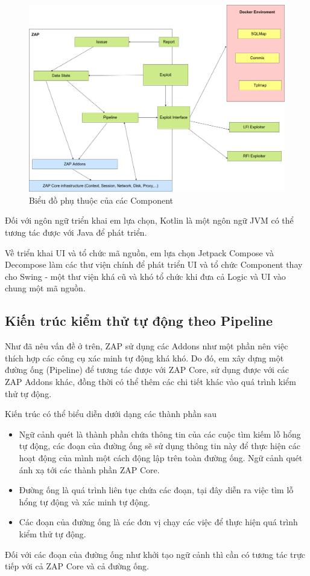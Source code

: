\documentclass[./../main.tex]{subfiles}
\begin{document}
\begin{figure}[h!]
	\includegraphics[width=\linewidth]{./images/component.drawio.png}
	\caption{Biểu đồ phụ thuộc của các Component}
	\label{fig:component}
\end{figure}

Đối với ngôn ngữ triển khai em lựa chọn, Kotlin là một ngôn ngữ JVM có thể tương tác được với Java để phát triển.

Về triển khai UI và tổ chức mã nguồn, em lựa chọn Jetpack Compose và Decompose làm các thư viện chính để phát triển UI và tổ chức Component thay cho Swing - một thư viện khá cũ và khó tổ chức khi đưa cả Logic và UI vào chung một mã nguồn.

\subsection{Kiến trúc kiểm thử tự động theo Pipeline}
Như đã nêu vấn đề ở trên, ZAP sử dụng các Addons như một phần nên việc thích hợp các công cụ xác minh tự động khá khó. Do đó, em xây dựng một đường ống (Pipeline) để tương tác được với ZAP Core, sử dụng được với các ZAP Addons khác, đồng thời có thể thêm các chi tiết khác vào quá trình kiểm thử tự động.

Kiến trúc có thể biểu diễn dưới dạng các thành phần sau
\begin{itemize}
	\item Ngữ cảnh quét là thành phần chứa thông tin của các cuộc tìm kiếm lỗ hổng tự động, các đoạn của đường ống sẽ sử dụng thông tin này để thực hiện các hoạt động của mình một cách động lập trên toàn đường ống. Ngữ cảnh quét ánh xạ tới các thành phần ZAP Core.
	\item Đường ống là quá trình liên tục chứa các đoạn, tại đây diễn ra việc tìm lỗ hổng tự động và xác minh tự động.
	\item Các đoạn của đường ống là các đơn vị chạy các việc để thực hiện quá trình kiểm thử tự động.
\end{itemize}
Đối với các đoạn của đường ống như khởi tạo ngữ cảnh thì cần có tương tác trực tiếp với cả ZAP Core và cả đường ống.
\end{document}
